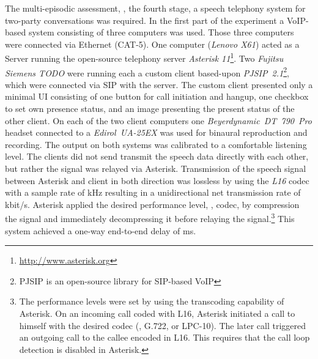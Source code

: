 The multi-episodic assessment, \ie, the fourth stage, a speech telephony system for two-party conversations was required.
In the first part of the experiment a \ac{VoIP}-based system consisting of three computers was used.
Those three computers were connected via Ethernet (CAT-5). 
One computer (\emph{Lenovo X61}) acted as a Server running the open-source telephony server \emph{Asterisk 11}\footnote{\url{http://www.asterisk.org}}.
Two \emph{Fujitsu Siemens TODO} were running each a custom client based-upon \emph{PJSIP~2.1}\footnote{PJSIP is an open-source library for \ac{SIP}-based \ac{VoIP}}, which were connected via \ac{SIP} with the server.
The custom client presented only a minimal \ac{UI} consisting of one button for call initiation and hangup, one checkbox to set own presence status, and an image presenting the present status of the other client.
On each of the two client computers one \emph{Beyerdynamic~DT~790~Pro} headset connected to a \emph{Edirol~UA-25EX} was used for binaural reproduction and recording.
The output on both systems was calibrated to a comfortable listening level. %
The clients did not send transmit the speech data directly with each other, but rather the signal was relayed via Asterisk.
Transmission of the speech signal between Asterisk and client in both direction was lossless by using the \emph{L16} codec with a sample rate of \unit[16]{kHz} resulting in a unidirectional net transmission rate of \unit[256]{kbit/s}. %
Asterisk applied the desired performance level, \ie, codec, by compression the signal and immediately decompressing it before relaying the signal.\footnote{The performance levels were set by using the transcoding capability of Asterisk. On an incoming call coded with L16, Asterisk initiated a call to himself with the desired codec (\ie, G.722, or LPC-10). The later call triggered an outgoing call to the callee encoded in L16. This requires that the call loop detection is disabled in Asterisk.}
This system achieved a one-way end-to-end delay of \unit[120]{ms}.


